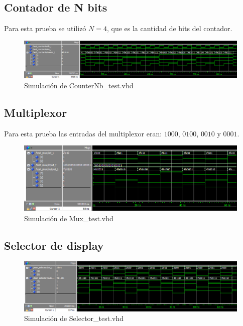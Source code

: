 \documentclass[10pt,spanish,a4paper,openany,notitlepage]{article}
\begin{document}
\subsection{Contador de N bits}

Para esta prueba se utilizó $N = 4$, que es la cantidad de bits del contador.

\begin{figure}[H] %
\begin{center}
\includegraphics[scale=0.5]{./imagenes/ContadorNb.png}
\caption{Simulación de CounterNb\_test.vhd}
 \label{fig:sim_ContadorNb}
\end{center}
\end{figure}

\subsection{Multiplexor}

Para esta prueba las entradas del multiplexor eran: $1000$, $0100$, $0010$ y $0001$.

\begin{figure}[H] %
\begin{center}
\includegraphics[scale=0.6]{./imagenes/Mux.png}
\caption{Simulación de Mux\_test.vhd}
 \label{fig:sim_Mux}
\end{center}
\end{figure}

\subsection{Selector de display}

\begin{figure}[H] %
\begin{center}
\includegraphics[scale=0.6]{./imagenes/selector.png}
\caption{Simulación de Selector\_test.vhd}
 \label{fig:sim_Selector}
\end{center}
\end{figure}
\end{document}
